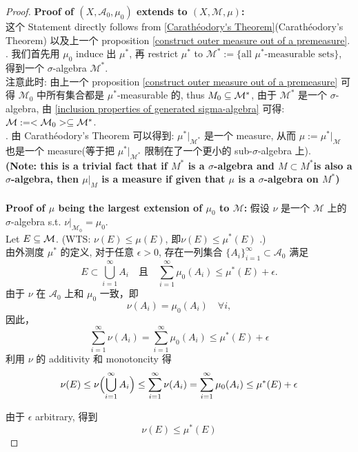 \documentclass[lang=cn,11pt]{elegantbook}
\begin{document}
\begin{proof}
\textbf{Proof of $(X,\mathcal{A}_0, \mu_0)$ extends to $(X,\mathcal{M},\mu)$:}\\
这个 Statement directly follows from \ref{Carathéodory's Theorem}(Carathéodory's Theorem) 以及上一个 proposition \ref{construct outer measure out of a premeasure}. \\
. 我们首先用 $\mu_0$ induce 出 $\mu^*$, 再 restrict $\mu^*$ to $ \mathcal{M}^* :=\{ \text{all } \mu^* \text{-measurable sets}  \}$, 得到一个 $\sigma$-algebra $\mathcal{M}^*$.\\
\noindent 注意此时: 由上一个 proposition \ref{construct outer measure out of a premeasure} 可得 $\mathcal{M}_0$ 中所有集合都是 $\mu^*$-measurable 的, thus $M_0 \subseteq \mathcal{M}^*$, 由于 $\mathcal{M}^*$ 是一个 $\sigma$-algebra, 由 \ref{inclusion properties of generated sigma-algebra} 可得: $\mathcal{M} := <\mathcal{M}_0> \subseteq \mathcal{M}^*$. \\
. 由 Carathéodory's Theorem 可以得到: $\mu^* | _{\mathcal{M}^*}$ 是一个 measure, 从而 $\mu :=\mu^* |_{\mathcal{M}}$ 也是一个 measure(等于把 $\mu^* | _{\mathcal{M}^*}$ 限制在了一个更小的 sub-$\sigma$-algebra 上).\\
\noindent\textbf{(Note: this is a trivial fact that if $M^*$ is a $\sigma$-algebra and $M \subset M^*$is also a $\sigma$-algebra, then $\mu |_{M}$ is a measure if given that $\mu$ is a $\sigma$-algebra on $M^*$)}\\\\
\noindent \textbf{Proof of $\mu$ being the largest extension of $\mu_0$ to $\mathcal{M}$:}
\noindent 假设 $\nu$ 是一个 $\mathcal{M}$ 上的 $\sigma$-algebra s.t. $\nu|_{\mathcal{M}_0} = \mu_0 $.\\
\noindent Let $E \subseteq \mathcal{M}$. (WTS: $\nu(E) \leq \mu(E)$, 即$\nu(E) \leq \mu^*(E)$ .)\\
\noindent 由外测度 \(\mu^*\) 的定义, 对于任意 \(\epsilon>0\), 存在一列集合 \(\{A_i\}_{i=1}^\infty \subset \mathcal{A}_0\) 满足
\[
E\subset \bigcup_{i=1}^\infty A_i \quad \text{且} \quad \sum_{i=1}^\infty \mu_0(A_i) \le \mu^*(E)+\epsilon.
\]
由于 \(\nu\) 在 \(\mathcal{A}_0\) 上和 \(\mu_0\) 一致，即
\[
\nu(A_i) = \mu_0(A_i) \quad \forall i,
\]
因此，
\[
\sum_{i=1}^\infty \nu(A_i) = \sum_{i=1}^\infty \mu_0(A_i) \le \mu^*(E)+\epsilon
\]
利用 \(\nu\) 的 additivity 和 monotoncity 得
\[
\nu(E) \le \nu\Bigl(\bigcup_{i=1}^\infty A_i\Bigr) \le \sum_{i=1}^\infty \nu(A_i) = \sum_{i=1}^\infty \mu_0(A_i) \le \mu^*(E)+\epsilon
\]

由于 \(\epsilon\) arbitrary, 得到
\[
\nu(E) \le \mu^*(E)
\]



\end{proof}
\end{document}
